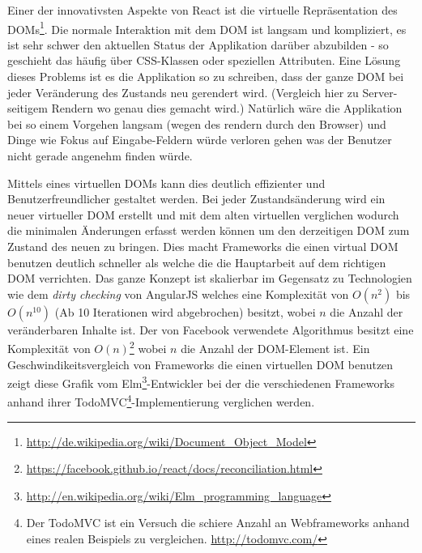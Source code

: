 \documentclass[12pt,twoside]{book}
\begin{document}
Einer der innovativsten Aspekte von React ist die virtuelle Repräsentation des DOMs\footnote{\url{http://de.wikipedia.org/wiki/Document_Object_Model}}. Die normale Interaktion mit dem DOM ist langsam und kompliziert, es ist sehr schwer den aktuellen Status der Applikation darüber abzubilden - so geschieht das häufig über CSS-Klassen oder speziellen Attributen.
Eine Lösung dieses Problems ist es die Applikation so zu schreiben, dass der ganze DOM bei jeder Veränderung des Zustands neu gerendert wird. (Vergleich hier zu Server-seitigem Rendern wo genau dies gemacht wird.) Natürlich wäre die Applikation bei so einem Vorgehen langsam (wegen des rendern durch den Browser) und Dinge wie Fokus auf Eingabe-Feldern würde verloren gehen was der Benutzer nicht gerade angenehm finden würde.

Mittels eines virtuellen DOMs kann dies deutlich effizienter und Benutzerfreundlicher gestaltet werden. Bei jeder Zustandsänderung wird ein neuer virtueller DOM erstellt und mit dem alten virtuellen verglichen wodurch die minimalen Änderungen erfasst werden können um den derzeitigen DOM zum Zustand des neuen zu bringen. Dies macht Frameworks die einen virtual DOM benutzen deutlich schneller als welche die die Hauptarbeit auf dem richtigen DOM verrichten. Das ganze Konzept ist skalierbar im Gegensatz zu Technologien wie dem \textit{dirty checking} von AngularJS welches eine Komplexität von $O(n^2)$ bis $O(n^10)$ (Ab 10 Iterationen wird abgebrochen) besitzt, wobei $n$ die Anzahl der veränderbaren Inhalte ist.
Der von Facebook verwendete Algorithmus besitzt eine Komplexität von $O(n)$\footnote{\url{https://facebook.github.io/react/docs/reconciliation.html}} wobei $n$ die Anzahl der DOM-Element ist.
Ein Geschwindikeitsvergleich von Frameworks die einen virtuellen DOM benutzen zeigt diese Grafik vom Elm\footnote{\url{http://en.wikipedia.org/wiki/Elm_programming_language}}-Entwickler bei der die verschiedenen Frameworks anhand ihrer TodoMVC\footnote{Der TodoMVC ist ein Versuch die schiere Anzahl an Webframeworks anhand eines realen Beispiels zu vergleichen. \url{http://todomvc.com/}}-Implementierung verglichen werden.
\end{document}
